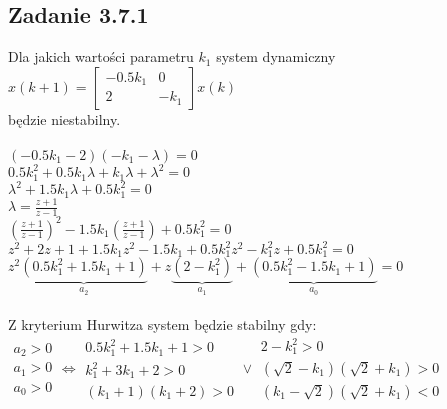 \subsection*{Zadanie 3.7.1} {\color{darkgray}
	Dla jakich wartości parametru $k_1$ system dynamiczny\\
	$x(k+1)=\left[ \begin{array}{cc}     -0.5k_1&0\\2&-k_1    \end{array}\right]x(k)$\\
	będzie niestabilny.
}\\\\
$(-0.5k_1-2)(-k_1-\lambda)=0$\\
$0.5k_1^2+0.5k_1\lambda+k_1\lambda+\lambda^2=0$\\
$\lambda^2+1.5k_1\lambda+0.5k_1^2=0$\\
$\lambda=\frac{z+1}{z-1}$\\
$(\frac{z+1}{z-1})^2-1.5k_1(\frac{z+1}{z-1})+0.5k_1^2=0$\\
$z^2+2z+1+1.5k_1z^2-1.5k_1+0.5k_1^2z^2-k_1^2z+0.5k_1^2=0$\\
$z^2\underbrace{(0.5k_1^2+1.5k_1+1)}_{a_2}+z\underbrace{(2-k_1^2)}_{a_1}+\underbrace{(0.5k_1^2-1.5k_1+1)}_{a_0}=0$\\\\
Z kryterium Hurwitza system będzie stabilny gdy:\\
 $\begin{array}{c}   a_2>0 \\ a_1>0 \\ a_0>0    \end{array} 
\Leftrightarrow  \begin{array}{r} 
	0.5k_1^2+1.5k_1+1>0 \\ 
	k_1^2+3k_1+2>0 \\
 	(k_1+1)(k_1+2)>0 
\end{array}   
\vee \begin{array}{r}
	2-k_1^2>0 \\
	(\sqrt{2}-k_1)(\sqrt{2}+k_1)>0\\
	(k_1-\sqrt{2})(\sqrt{2}+k_1)<0
\end{array}$

